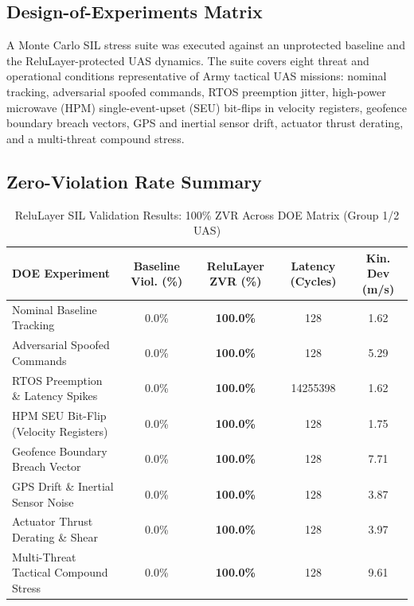 \documentclass[11pt,oneside]{article}
\begin{document}
\subsection{Design-of-Experiments Matrix}

A Monte Carlo SIL stress suite was executed against an unprotected baseline and the ReluLayer-protected UAS dynamics. The suite covers eight threat and operational conditions representative of Army tactical UAS missions: nominal tracking, adversarial spoofed commands, RTOS preemption jitter, high-power microwave (HPM) single-event-upset (SEU) bit-flips in velocity registers, geofence boundary breach vectors, GPS and inertial sensor drift, actuator thrust derating, and a multi-threat compound stress.

\subsection{Zero-Violation Rate Summary}

\begin{table}[htbp]
\centering
\caption{ReluLayer SIL Validation Results: 100\% ZVR Across DOE Matrix (Group 1/2 UAS)}
\label{tab:relulayer_doe_results}
\small
\begin{tabularx}{\textwidth}{@{}>{\raggedright\arraybackslash}Xcccc@{}}
\hline
\textbf{DOE Experiment} & \textbf{Baseline Viol. (\%)} & \textbf{ReluLayer ZVR (\%)} & \textbf{Latency (Cycles)} & \textbf{Kin. Dev (m/s)} \\
\hline
Nominal Baseline Tracking & 0.0\% & \textbf{100.0\%} & 128 & 1.62 \\
Adversarial Spoofed Commands & 0.0\% & \textbf{100.0\%} & 128 & 5.29 \\
RTOS Preemption \& Latency Spikes & 0.0\% & \textbf{100.0\%} & 14255398 & 1.62 \\
HPM SEU Bit-Flip (Velocity Registers) & 0.0\% & \textbf{100.0\%} & 128 & 1.75 \\
Geofence Boundary Breach Vector & 0.0\% & \textbf{100.0\%} & 128 & 7.71 \\
GPS Drift \& Inertial Sensor Noise & 0.0\% & \textbf{100.0\%} & 128 & 3.87 \\
Actuator Thrust Derating \& Shear & 0.0\% & \textbf{100.0\%} & 128 & 3.97 \\
Multi-Threat Tactical Compound Stress & 0.0\% & \textbf{100.0\%} & 128 & 9.61 \\
\hline
\end{tabularx}
\end{table}
\end{document}
